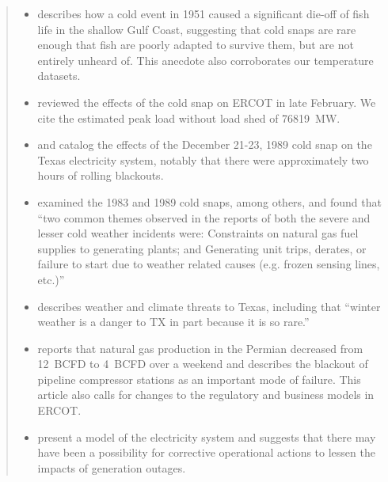 \documentclass{ar2rc}
\begin{document}
\begin{quote}
\begin{itemize}
    \item \citet{gunter_fishes:1951} describes how a cold event in 1951 caused a significant die-off of fish life in the shallow Gulf Coast, suggesting that cold snaps are rare enough that fish are poorly adapted to survive them, but are not entirely unheard of. This anecdote also corroborates our temperature datasets.
    \item \citet{magness_review:2021} reviewed the effects of the cold snap on ERCOT in late February. We cite the estimated peak load without load shed of \SI{76819}{\mega\watt}.
    \item \citet{nerc_operation:1989} and \citet{osborne_twofreezes:2021} catalog the effects of the December 21-23, 1989 cold snap on the Texas electricity system, notably that there were approximately two hours of rolling blackouts.
    \item \citet{nerc_previous:2013} examined the 1983 and 1989 cold snaps, among others, and found that ``two common themes observed in the reports of both the severe and lesser cold weather incidents were: Constraints on natural gas fuel supplies to generating plants; and Generating unit trips, derates, or failure to start due to weather related causes (e.g. frozen sensing lines, etc.)''
    \item \citet{nielsen-gammon_txacc:2011} describes weather and climate threats to Texas, including that ``winter weather is a danger to TX in part because it is so rare.''
    \item \citet{smead_eyesoftx:2021} reports that natural gas production in the Permian decreased from \SI{12}{BCFD} to \SI{4}{BCFD} over a weekend and describes the blackout of pipeline compressor stations as an important mode of failure. This article also calls for changes to the regulatory and business models in ERCOT.
    \item \citet{wu_tx:2021} present a model of the electricity system and suggests that there may have been a possibility for corrective operational actions to lessen the impacts of generation outages.
  \end{itemize}
\end{quote}

\end{document}
